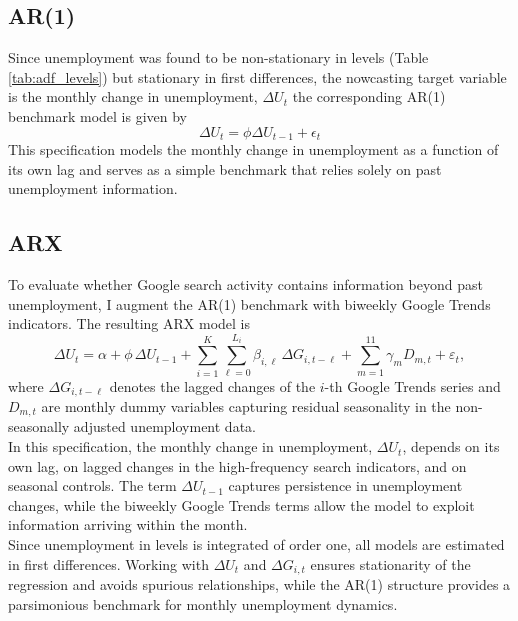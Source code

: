 \documentclass[12pt,a4paper]{article}
\begin{document}
\subsection{AR(1)}
Since unemployment was found to be non-stationary in levels (Table \ref{tab:adf_levels}) but stationary in first differences, the nowcasting target variable is the monthly change in unemployment, $\Delta U_t$ the corresponding AR(1) benchmark model is given by
\begin{equation}
    \Delta U_t =  \phi \Delta U_{t-1} + \epsilon_t
\end{equation}
This specification models the monthly change in unemployment as a function of its own lag and serves as a simple benchmark that relies solely on past unemployment information. 
\subsection{ARX}
To evaluate whether Google search activity contains information beyond past unemployment, 
I augment the AR(1) benchmark with biweekly Google Trends indicators. The resulting ARX model is
\begin{equation}
    \Delta U_t 
    = \alpha 
    + \phi \,\Delta U_{t-1}
    + \sum_{i=1}^{K} \sum_{\ell=0}^{L_i} \beta_{i,\ell} \,\Delta G_{i,t-\ell} 
    + \sum_{m=1}^{11} \gamma_m D_{m,t}
    + \varepsilon_t,
    \label{eq:arx_main}
\end{equation}
where $\Delta G_{i,t-\ell}$ denotes the lagged changes of the $i$-th Google Trends series and $D_{m,t}$ are monthly dummy variables capturing residual seasonality in the non-seasonally adjusted unemployment data.\\
In this specification, the monthly change in unemployment, $\Delta U_t$, depends on its own lag, on lagged changes in the high-frequency search indicators, and on seasonal controls. The term $\Delta U_{t-1}$ captures persistence in unemployment changes, while the biweekly Google Trends terms allow the model to exploit information arriving within the month.\\
Since unemployment in levels is integrated of order one, all models are estimated in first differences. Working with $\Delta U_t$ and $\Delta G_{i,t}$ ensures stationarity of the regression and avoids spurious relationships, while the AR(1) structure provides a parsimonious benchmark for monthly unemployment dynamics.
\end{document}
